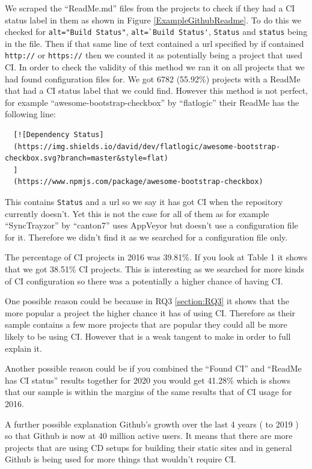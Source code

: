 \documentclass[10pt,conference]{IEEEtran}
\begin{document}
We scraped the \enquote{ReadMe.md} files from the projects to check if they had a CI status label in them as shown in Figure \ref{ExampleGithubReadme}. To do this we checked for \verb|alt="Build Status"|, \verb|alt=`Build Status'|, \verb|Status| and \verb|status| being in the file. Then if that same line of text contained a url specified by if contained \verb|http://| or \verb|https://| then we counted it as potentially being a project that used CI. In order to check the validity of this method we ran it on all projects that we had found configuration files for. We got 6782 (55.92\%) projects with a ReadMe that had a CI status label that we could find.
However this method is not perfect, for example \enquote{awesome-bootstrap-checkbox} by \enquote{flatlogic} \cite{GithubReadMeIncorrectFind} their ReadMe has the following line:
\begin{verbatim}
  [![Dependency Status]
  (https://img.shields.io/david/dev/flatlogic/awesome-bootstrap-checkbox.svg?branch=master&style=flat)
  ]
  (https://www.npmjs.com/package/awesome-bootstrap-checkbox) 
\end{verbatim}
This contains \verb|Status| and a url so we say it has got CI when the repository currently doesn't. Yet this is not the case for all of them as for example \enquote{SyncTrayzor} by \enquote{canton7} \cite{Male2020} uses AppVeyor but doesn't use a configuration file for it. Therefore we didn't find it as we searched for a configuration file only. 

The percentage of CI projects in 2016 was 39.81\%. If you look at Table 1 it shows that we got 38.51\% CI projects. This is interesting as we searched for more kinds of CI configuration so there was a potentially a higher chance of having CI.

One possible reason could be because in RQ3 \ref{section:RQ3} it shows that the more popular a project the higher chance it has of using CI. Therefore as their sample contains a few more projects that are popular they could all be more likely to be using CI. However that is a weak tangent to make in order to full explain it.  

Another possible reason could be if you combined the \enquote{Found CI} and \enquote{ReadMe has CI status} results together for 2020 you would get 41.28\% which is shows that our sample is within the margins of the same results that of CI usage for 2016.

A further possible explanation Github's growth over the last 4 years (\citet{GithubOctoverseResults2016} to 2019 \citet{GithubOctoverseResults}) so that Github is now at 40 million active users. It means that there are more projects that are using CD setups for building their static sites and in general Github is being used for more things that wouldn't require CI.
\end{document}
